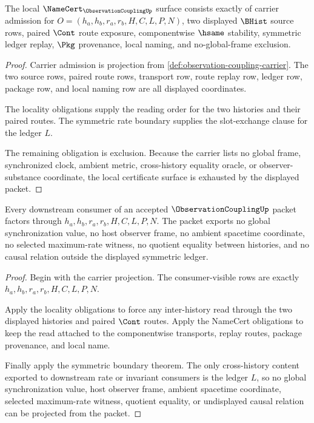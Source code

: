 \begin{theorem}
\label{thm:observation-coupling-namecert-obligations}
The local $\NameCert_{\ObservationCouplingUp}$ surface consists exactly of carrier admission for $O=(h_a,h_b,r_a,r_b,H,C,L,P,N)$, two displayed $\BHist$ source rows, paired $\Cont$ route exposure, componentwise $\hsame$ stability, symmetric ledger replay, $\Pkg$ provenance, local naming, and no-global-frame exclusion.
\end{theorem}
\begin{proof}
Carrier admission is projection from \autoref{def:observation-coupling-carrier}. The two source rows, paired route rows, transport row, route replay row, ledger row, package row, and local naming row are all displayed coordinates.

The locality obligations supply the reading order for the two histories and their paired routes. The symmetric rate boundary supplies the slot-exchange clause for the ledger $L$.

The remaining obligation is exclusion. Because the carrier lists no global frame, synchronized clock, ambient metric, cross-history equality oracle, or observer-substance coordinate, the local certificate surface is exhausted by the displayed packet.
\end{proof}

\begin{theorem}
\label{thm:observation-coupling-ledger-nonescape}
Every downstream consumer of an accepted $\ObservationCouplingUp$ packet factors through $h_a,h_b,r_a,r_b,H,C,L,P,N$. The packet exports no global synchronization value, no host observer frame, no ambient spacetime coordinate, no selected maximum-rate witness, no quotient equality between histories, and no causal relation outside the displayed symmetric ledger.
\end{theorem}
\begin{proof}
Begin with the carrier projection. The consumer-visible rows are exactly $h_a,h_b,r_a,r_b,H,C,L,P,N$.

Apply the locality obligations to force any inter-history read through the two displayed histories and paired $\Cont$ routes. Apply the NameCert obligations to keep the read attached to the componentwise transports, replay routes, package provenance, and local name.

Finally apply the symmetric boundary theorem. The only cross-history content exported to downstream rate or invariant consumers is the ledger $L$, so no global synchronization value, host observer frame, ambient spacetime coordinate, selected maximum-rate witness, quotient equality, or undisplayed causal relation can be projected from the packet.
\end{proof}

